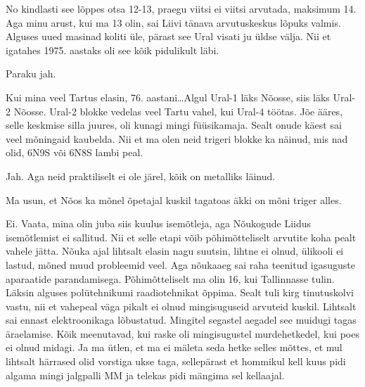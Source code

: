 
No kindlasti see lõppes otsa 12-13, praegu viitsi ei viitsi arvutada, maksimum 14. Aga minu arust, kui ma 13 olin, sai Liivi tänava arvutuskeskus lõpuks valmis. Alguses uued masinad koliti üle, pärast see Ural visati ju üldse välja. Nii et igatahes 1975. aastaks oli see kõik pidulikult läbi. 


Paraku jah. 

Kui mina veel Tartus elasin, 76. aastani\ldots Algul Ural-1 läks Nõosse, siis läks Ural-2 Nõosse. Ural-2 blokke vedelas veel Tartu vahel,  kui Ural-4 töötas. Jõe ääres, selle keskmise silla juures,  oli kunagi mingi füüsikamaja. Sealt onude käest sai veel mõningaid kaubelda. Nii et ma olen neid trigeri blokke ka näinud, mis nad olid, 6N9S või 6N8S lambi peal. 


Jah. Aga neid praktiliselt ei ole järel,  kõik on  metalliks läinud. 


Ma usun, et Nõos ka mõnel õpetajal kuskil tagatoas äkki on mõni triger alles. 


Ei. Vaata, mina olin juba siis kuulus isemõtleja, aga Nõukogude Liidus isemõtlemist ei sallitud. Nii et selle etapi võib  põhimõtteliselt arvutite koha pealt vahele jätta. Nõuka ajal lihtsalt elasin nagu suutsin, lihtne ei olnud, ülikooli ei lastud, mõned muud probleemid veel. Aga nõukaaeg sai raha teenitud igasuguste aparaatide parandamisega. Põhimõtteliselt ma olin 16, kui Tallinnasse tulin. Läksin alguses  polütehnikumi raadiotehnikat õppima. Sealt tuli kirg tinutuskolvi vastu, nii et vahepeal väga pikalt ei olnud mingisuguseid arvuteid kuskil. Lihtsalt sai ennast elektroonikaga lõbustatud. Mingitel segastel aegadel see muidugi tagas äraelamise. Kõik meenutavad, kui raske oli mingisugustel murdehetkedel, kui poes ei olnud midagi. Ja ma ütlen, et ma ei mäleta seda hetke selles mõttes, et mul lihtsalt härrased olid vorstiga ukse taga, sellepärast et hommikul kell kuus pidi algama mingi jalgpalli MM  ja telekas pidi mängima sel kellaajal. 

